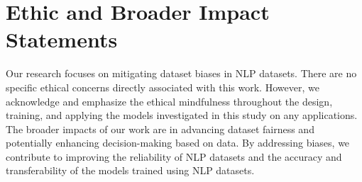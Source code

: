 \section*{Ethic and Broader Impact Statements}
Our research focuses on mitigating dataset biases in NLP datasets. There are no specific ethical concerns directly associated with this work. However, we acknowledge and emphasize the ethical mindfulness throughout the design, training, and applying the models investigated in this study on any applications.
The broader impacts of our work are in advancing dataset fairness and potentially enhancing decision-making based on data. By addressing biases, we contribute to improving the reliability of NLP datasets and the accuracy and transferability of the models trained using NLP datasets. 

